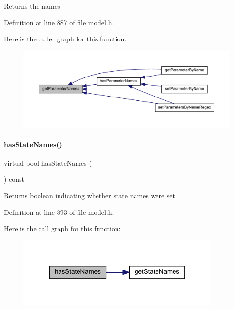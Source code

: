 \begin{DoxyReturn}{Returns}
the names 
\end{DoxyReturn}


Definition at line 887 of file model.\+h.

Here is the caller graph for this function\+:
\nopagebreak
\begin{figure}[H]
\begin{center}
\leavevmode
\includegraphics[width=350pt]{classamici_1_1_model_a7bc0cf1cdd032486ba923fc1d9678262_icgraph}
\end{center}
\end{figure}
\mbox{\label{classamici_1_1_model_a219d9d04b7eeed20cf4ba36536cd0a4c}} 
\paragraph{\texorpdfstring{has\+State\+Names()}{hasStateNames()}}
{\footnotesize\ttfamily virtual bool has\+State\+Names (\begin{DoxyParamCaption}{ }\end{DoxyParamCaption}) const\hspace{0.3cm}{\ttfamily [virtual]}}

\begin{DoxyReturn}{Returns}
boolean indicating whether state names were set 
\end{DoxyReturn}


Definition at line 893 of file model.\+h.

Here is the call graph for this function\+:
\nopagebreak
\begin{figure}[H]
\begin{center}
\leavevmode
\includegraphics[width=288pt]{classamici_1_1_model_a219d9d04b7eeed20cf4ba36536cd0a4c_cgraph}
\end{center}
\end{figure}
\mbox{\label{classamici_1_1_model_a1c55f5cf94db51bb2bbb26d4c425eb0a}} 
